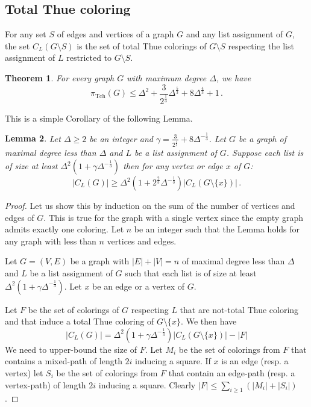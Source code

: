 \documentclass[a4paper,10pt]{article}
\newtheorem{theorem}{Theorem}
\newtheorem{lemma}[theorem]{Lemma}
\begin{document}
\subsection{Total Thue coloring}\label{sectionttc}
For any set $S$ of edges and vertices of a graph $G$ and any list assignment of $G$, the set $C_L(G\setminus S)$ is the set of total Thue colorings of $G\setminus S$ respecting the list assignment of $L$ restricted to $G\setminus S$. 

\begin{theorem}\label{totalthuecoloringthm}
 For every graph $G$ with maximum degree $\Delta$, we have
 $$\pi_{\operatorname{Tch}}(G)\le
 \Delta^2+\frac{3}{2^\frac{1}{3}}\Delta^{\frac{5}{3}}+8\Delta^{\frac{4}{3}}+1\,.$$ 
\end{theorem}
This is a simple Corollary of the following Lemma.
\begin{lemma}
Let $\Delta\ge2$ be an integer and $\gamma =\frac{3}{2^{\frac{1}{3}}}+8\Delta^{-\frac{1}{3}}$.
Let $G$ be a graph of maximal degree less than $\Delta$ and $L$ be a list assignment of $G$.
Suppose each list is of size at least $\Delta^2(1+\gamma\Delta^{-\frac{1}{3}})$
then for any vertex or edge $x$ of $G$:
 $$|C_L(G)|\ge \Delta^2\left(1+2^{\frac{2}{3}}\Delta^{-\frac{1}{3}}\right)|C_L(G\setminus\{x\})|\,.$$
\end{lemma}\begin{proof}
 Let us show this by induction on the sum of the number of vertices and edges of $G$.
 This is true for the graph with a single vertex since the empty graph admits exactly one coloring.
 Let $n$ be an integer such that the Lemma holds for any graph with less than $n$ vertices and edges.
 
 Let $G=(V,E)$ be a graph with $|E|+|V|=n$ of maximal degree less than $\Delta$ and
 $L$ be a list assignment of $G$ such that each list is of size at least $\Delta^2(1+\gamma\Delta^{-\frac{1}{3}})$.
 Let $x$ be an edge or a vertex of $G$.
 
 Let $F$ be the set of colorings of $G$  respecting $L$ that are not-total Thue coloring and
 that induce a total Thue coloring of $G\setminus\{x\}$. We then have
 \begin{equation}\label{maineqtotalnonrep}
  |C_L(G)|= \Delta^2(1+\gamma\Delta^{-\frac{1}{3}}) |C_L(G\setminus\{x\})|- |F|
 \end{equation}
We need to upper-bound the size of $F$.
Let $M_i$ be the set of colorings from $F$ that contains a mixed-path of length $2i$ inducing a square.
If $x$ is an edge (resp. a vertex) let $S_i$ be the set 
of colorings from $F$ that contain an edge-path (resp. a vertex-path) of length $2i$ inducing a square.
Clearly $|F|\le\sum_{i\ge1} (|M_i|+|S_i|)$.


\end{proof}
\end{document}
